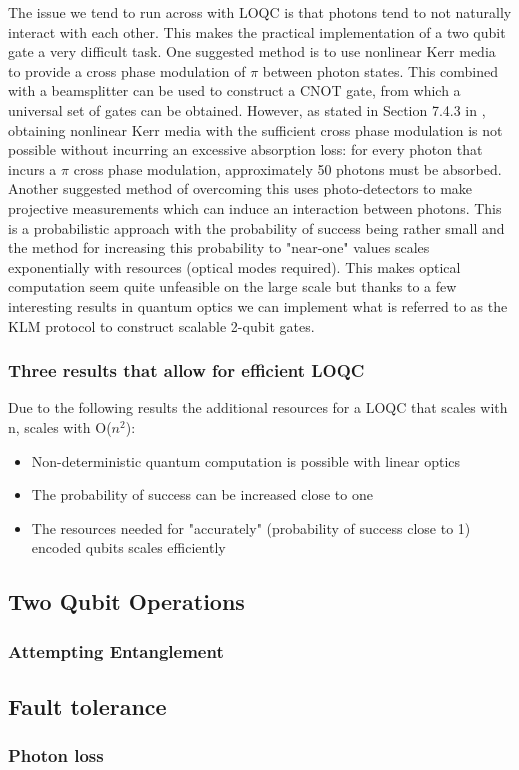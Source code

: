 The issue we tend to run across with LOQC is that photons tend to not naturally interact with each other. This makes the practical implementation of a two qubit gate a very difficult task. One suggested method is to use nonlinear Kerr media to provide a cross phase modulation of $\pi$ between photon states. This combined with a beamsplitter can be used to construct a CNOT gate, from which a universal set of gates can be obtained. However, as stated in Section 7.4.3 in \cite{nielsen_chuang_2010}, obtaining nonlinear Kerr media with the sufficient cross phase modulation is not possible without incurring an excessive absorption loss: for every photon that incurs a $\pi$ cross phase modulation, approximately 50 photons must be absorbed. Another suggested method of overcoming this uses photo-detectors to make projective measurements which can induce an interaction between photons\cite{Kok:2005jip}. This is a probabilistic approach with the probability of success being rather small and the method for increasing this probability to "near-one" values scales exponentially with resources (optical modes required). This makes optical computation seem quite unfeasible on the large scale but thanks to a few interesting results in quantum optics we can implement what is referred to as the KLM protocol to construct scalable 2-qubit gates.


\subsubsection{Three results that allow for efficient LOQC}
Due to the following results the additional resources for a LOQC that scales with n, scales with O($n^2$):
\begin{itemize}
    \item Non-deterministic quantum computation is possible with linear optics
    \item The probability of success can be increased close to one
    \item The resources needed for "accurately" (probability of success close to 1) encoded qubits scales efficiently  
\end{itemize}


\subsection{Two Qubit Operations}
\subsubsection{Attempting Entanglement}



\subsection{Fault tolerance}
\subsubsection{Photon loss}